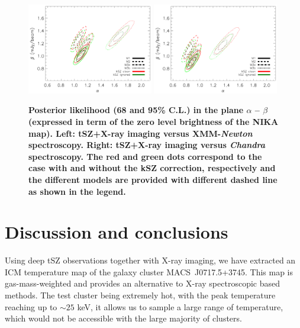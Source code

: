\documentclass[twocolumn,traditabstract]{aa}
\begin{document}
\begin{figure}[h]
\centering
\includegraphics[width=0.49\textwidth]{Figure/Fit_Results_Likelihood_gmw-XMM.pdf}
\includegraphics[width=0.49\textwidth]{Figure/Fit_Results_Likelihood_gmw-CXO.pdf}
\caption{\footnotesize{\bf Posterior likelihood (68 and 95\% C.L.) in the plane $\alpha$ -- $\beta$ (expressed in term of the zero level brightness of the NIKA map). {\bf Left:} tSZ+X-ray imaging versus XMM-\textit{Newton} spectroscopy. {\bf Right:} tSZ+X-ray imaging versus \textit{Chandra} spectroscopy. The red and green dots correspond to the case with and without the kSZ correction, respectively and the different models are provided with different dashed line as shown in the legend.}}
\label{fig:T_SZ_T_X_posterior}
\end{figure}

\section{Discussion and conclusions}\label{sec:conclusions}
Using deep tSZ observations together with X-ray imaging, we have extracted an ICM temperature map of the galaxy cluster \mbox{MACS~J0717.5+3745}. This map is gas-mass-weighted and provides an alternative to X-ray spectroscopic based methods. The test cluster being extremely hot, with the peak temperature reaching up to $\sim 25$ keV, it allows us to sample a large range of temperature, which would not be accessible with the large majority of clusters.
\end{document}
